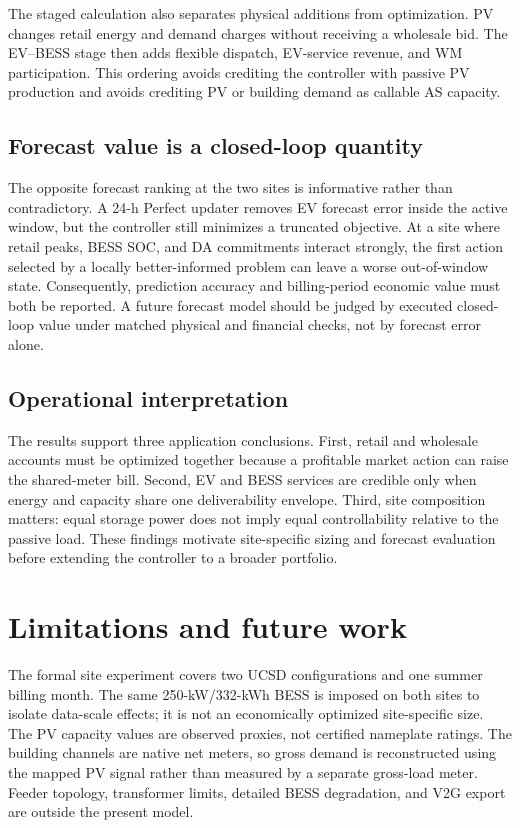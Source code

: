\documentclass[final,5p,times]{elsarticle}
\begin{document}
The staged calculation also separates physical additions from optimization.
PV changes retail energy and demand charges without receiving a wholesale bid.
The EV--BESS stage then adds flexible dispatch, EV-service revenue, and WM
participation. This ordering avoids crediting the controller with passive PV
production and avoids crediting PV or building demand as callable AS capacity.

\subsection{Forecast value is a closed-loop quantity}

The opposite forecast ranking at the two sites is informative rather than
contradictory. A 24-h Perfect updater removes EV forecast error inside the
active window, but the controller still minimizes a truncated objective. At a
site where retail peaks, BESS SOC, and DA commitments interact strongly, the
first action selected by a locally better-informed problem can leave a worse
out-of-window state. Consequently, prediction accuracy and billing-period
economic value must both be reported. A future forecast model should be judged
by executed closed-loop value under matched physical and financial checks, not
by forecast error alone.

\subsection{Operational interpretation}

The results support three application conclusions. First, retail and wholesale
accounts must be optimized together because a profitable market action can
raise the shared-meter bill. Second, EV and BESS services are credible only
when energy and capacity share one deliverability envelope. Third, site
composition matters: equal storage power does not imply equal controllability
relative to the passive load. These findings motivate site-specific sizing and
forecast evaluation before extending the controller to a broader portfolio.

\section{Limitations and future work}
\label{sec:limitations}

The formal site experiment covers two UCSD configurations and one summer
billing month. The same 250-kW/332-kWh BESS is imposed on both sites to isolate
data-scale effects; it is not an economically optimized site-specific size.
The PV capacity values are observed proxies, not certified nameplate ratings.
The building channels are native net meters, so gross demand is reconstructed
using the mapped PV signal rather than measured by a separate gross-load meter.
Feeder topology, transformer limits, detailed BESS degradation, and V2G export
are outside the present model.
\end{document}
